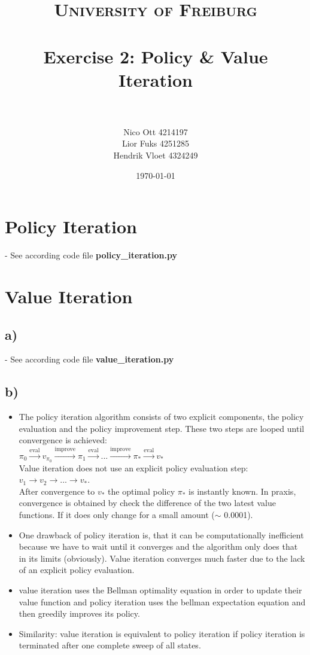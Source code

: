 \documentclass[paper=a4, fontsize=10pt]{scrartcl} %
\title{	
\normalfont \normalsize 
\textsc{University of Freiburg} \\ [25pt] %
\horrule{0.5pt} \\[0.4cm] %
\huge Exercise 2: Policy \& Value Iteration \\ %
\horrule{2pt} \\[0.5cm] %
}
\author{Nico Ott 4214197\\ Lior Fuks 4251285 \\Hendrik Vloet 4324249}
\date{\normalsize\today} %
\numberwithin{equation}{section} %
\numberwithin{figure}{section} %
\numberwithin{table}{section} %
\begin{document}
\maketitle %

\section{Policy Iteration}
- See according code file \textbf{policy\_iteration.py}


\section{Value Iteration}
\subsection*{a)}
- See according code file \textbf{value\_iteration.py}
\subsection*{b)}
\begin{itemize}

\item The policy iteration algorithm consists of two explicit components, the policy evaluation and the policy improvement step. These two steps are looped until convergence is achieved:\\
$ \pi_0 \xrightarrow{\text{eval}} v_{\pi_0} \xrightarrow{\text{improve}} \pi_1 \xrightarrow{\text{eval}} ... \xrightarrow{\text{improve}} \pi_* \xrightarrow{\text{eval}} v_* $ \\
Value iteration does not use an explicit policy evaluation step: $v_1 \rightarrow v_2 \rightarrow ...  \rightarrow v_*$.\\
 After convergence to $v_*$ the optimal policy $\pi_*$ is instantly known.
In praxis, convergence is obtained by check the difference of the two latest value functions. If it does only change for a small amount ($\sim$ 0.0001). 
\item One drawback of policy iteration is, that it can be computationally inefficient because we have to wait until it converges and the algorithm only does that in its limits (obviously). Value iteration converges much faster due to the lack of an explicit policy evaluation.

\item value iteration uses the Bellman optimality equation in order to update their value function and policy iteration uses the bellman expectation equation and then greedily improves its policy. 
\item Similarity: value iteration is equivalent to policy iteration if policy iteration is terminated after one complete sweep of all states.\\
\end{itemize}
\clearpage
\end{document}

